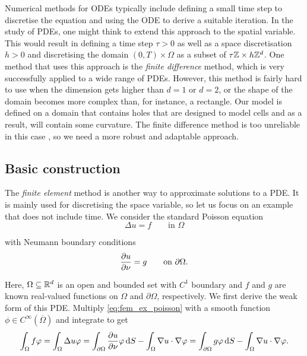 Numerical methods for ODEs typically include defining a small time step to discretise the equation and using the ODE to derive a suitable iteration. In the study of PDEs, one might think to extend this approach to the spatial variable. This would result in defining a time step $\tau > 0$ as well as a space discretisation $h > 0$ and discretising the domain $(0, T) \times \Omega$ as a subset of $\tau \Z \times h\Z^{d}$. One method that uses this approach is the \emph{finite difference} method, which is very successfully applied to a wide range of PDEs. However, this method is fairly hard to use when the dimension gets higher than $d = 1$ or $d = 2$, or the shape of the domain becomes more complex than, for instance, a rectangle. Our model is defined on a domain that contains holes that are designed to model cells and as a result, will contain some curvature. The finite difference method is too unreliable in this case \cite{quarteroni07}, so we need a more robust and adaptable approach.

\subsection{Basic construction}

The \emph{finite element} method is another way to approximate solutions to a PDE. It is mainly used for discretising the space variable, so let us focus on an example that does not include time. We consider the standard Poisson equation
%
\begin{equation}
    \label{eq:fem_ex_poisson}
    \Delta u = f \qquad \text{in } \Omega
\end{equation}

\noindent
with Neumann boundary conditions
%
\begin{equation}
    \label{eq:fem_ex_neumann_pois}
    \pderiv[u]{\nu} = g \qquad \text{on } \partial \Omega.
\end{equation}

\noindent
Here, $\Omega \subseteq \R^d$ is an open and bounded set with $C^1$ boundary and $f$ and $g$ are known real-valued functions on $\Omega$ and $\partial \Omega$, respectively. We first derive the weak form of this PDE. Multiply \cref{eq:fem_ex_poisson} with a smooth function $\phi \in C^\infty(\overline{\Omega})$ and integrate to get
%
\begin{equation*}
    \int_\Omega f \phi = \int_\Omega \Delta u \phi = \int_{\partial \Omega} \pderiv[u]{\nu} \phi \d S - \int_\Omega \nabla u \cdot \nabla \phi = \int_{\partial \Omega} g \phi \d S - \int_\Omega \nabla u \cdot \nabla \phi.
\end{equation*}

